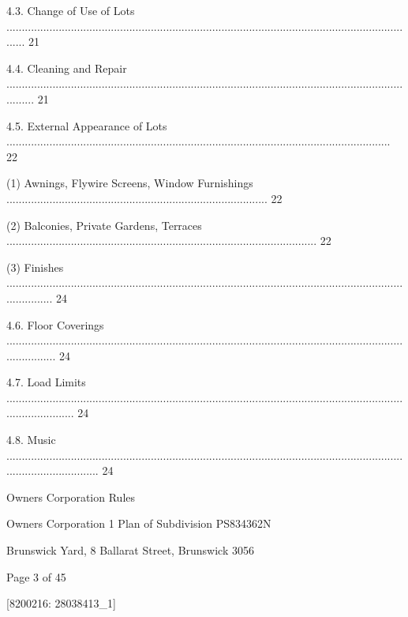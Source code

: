 \documentclass{article}
\begin{document}
{\fontsize{9.99}{1}4.3. Change of Use of Lots ....................................................................................................................................... 21 }

{\fontsize{9.99}{1}4.4. Cleaning and Repair .......................................................................................................................................... 21 }

{\fontsize{9.99}{1}4.5. External Appearance of Lots ............................................................................................................................. 22 }

{\fontsize{9.962}{1}(1) Awnings, Flywire Screens, Window Furnishings ..................................................................................... 22 }

{\fontsize{9.962}{1}(2) Balconies, Private Gardens, Terraces ..................................................................................................... 22 }

{\fontsize{9.962}{1}(3) Finishes ................................................................................................................................................ 24 }

{\fontsize{9.99}{1}4.6. Floor Coverings ................................................................................................................................................. 24 }

{\fontsize{9.99}{1}4.7. Load Limits ....................................................................................................................................................... 24 }

{\fontsize{9.99}{1}4.8. Music ............................................................................................................................................................... 24 }

\newpage





{\fontsize{9}{1}Owners Corporation Rules }

{\fontsize{9}{1}Owners Corporation 1 Plan of Subdivision PS834362N }

{\fontsize{9}{1}Brunswick Yard, 8 Ballarat Street, Brunswick 3056 }


{\fontsize{9}{1}Page 3  of 45 }



{\fontsize{7.02}{1}[8200216: 28038413\_1] }
\end{document}
